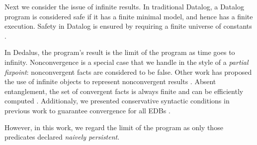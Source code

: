 Next we consider the issue of infinite results.  In traditional Datalog, a Datalog program is considered safe if it has a finite
minimal model, and hence has a finite execution. Safety in Datalog is ensured by requiring a finite universe of constants .

In Dedalus, the program's result is the limit of the program as time goes to infinity.  Nonconvergence is a special case that we handle in the style of a {\em partial fixpoint}: nonconvergent facts are considered to be false.  Other work has proposed the use of infinite objects to represent nonconvergent results .  Absent entanglement, the set of convergent facts is always finite and can be efficiently computed .  Additionaly, we presented conservative syntactic conditions in previous work to guarantee convergence for all EDBs .

However, in this work, we regard the limit of the program as only those predicates declared {\em naively persistent}.  




